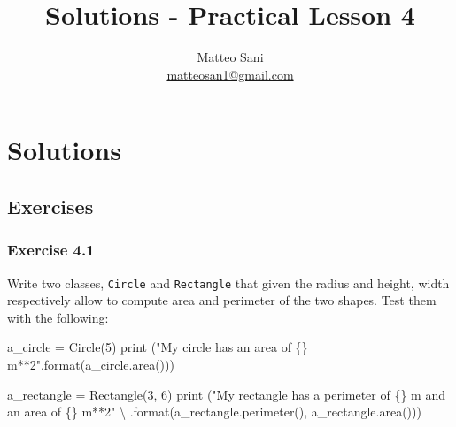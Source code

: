 \documentclass[11pt]{article}
\title{Solutions - Practical Lesson 4}
\author{Matteo Sani \\\href{mailto:matteosan1@gmail.com}{matteosan1@gmail.com}}
\newenvironment{Shaded}{}{}
\newcommand{\DecValTok}[1]{\textcolor[rgb]{0.25,0.63,0.44}{{#1}}}
\newcommand{\StringTok}[1]{\textcolor[rgb]{0.25,0.44,0.63}{{#1}}}
\newcommand{\NormalTok}[1]{{#1}}
\newcommand{\SpecialCharTok}[1]{\textcolor[rgb]{0.25,0.44,0.63}{{#1}}}
\newcommand{\OperatorTok}[1]{\textcolor[rgb]{0.40,0.40,0.40}{{#1}}}
\newcommand{\BuiltInTok}[1]{{#1}}
\begin{document}
    
    
    \maketitle
    
    

    
    \hypertarget{solutions---practical-lesson-4}{%
\section{Solutions}\label{solutions---practical-lesson-4}}

\hypertarget{exercises}{%
\subsection{Exercises}\label{exercises}}

\hypertarget{exercise-4.1}{%
\subsubsection{Exercise 4.1}\label{exercise-4.1}}

Write two classes, \texttt{Circle} and \texttt{Rectangle} that given the
radius and height, width respectively allow to compute area and
perimeter of the two shapes. Test them with the following:

\begin{Shaded}
\begin{Highlighting}[]
\NormalTok{a_circle }\OperatorTok{=}\NormalTok{ Circle(}\DecValTok{5}\NormalTok{)}
\BuiltInTok{print}\NormalTok{ (}\StringTok{"My circle has an area of }\SpecialCharTok{\{\}}\StringTok{ m**2"}\NormalTok{.}\BuiltInTok{format}\NormalTok{(a_circle.area()))}

\NormalTok{a_rectangle }\OperatorTok{=}\NormalTok{ Rectangle(}\DecValTok{3}\NormalTok{, }\DecValTok{6}\NormalTok{)}
\BuiltInTok{print}\NormalTok{ (}\StringTok{"My rectangle has a perimeter of }\SpecialCharTok{\{\}}\StringTok{ m and an area of }\SpecialCharTok{\{\}}\StringTok{ m**2"}\NormalTok{ \textbackslash{}}
\NormalTok{    .}\BuiltInTok{format}\NormalTok{(a_rectangle.perimeter(), a_rectangle.area()))}
\end{Highlighting}
\end{Shaded}
\end{document}

